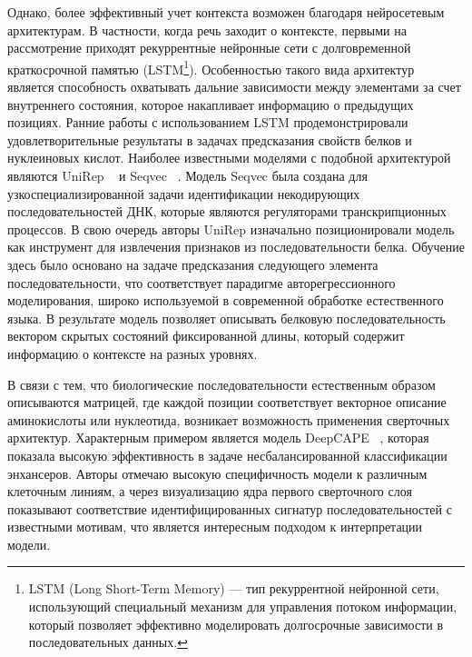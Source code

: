 \documentclass[specification,annotation,times]{itmo-student-thesis}
\begin{document}
Однако, более эффективный учет контекста возможен благодаря нейросетевым архитектурам. В частности, когда речь заходит о контексте, первыми на рассмотрение приходят рекуррентные нейронные сети с долговременной краткосрочной памятью (LSTM\footnote{LSTM (Long Short-Term Memory) --- тип рекуррентной нейронной сети, использующий специальный механизм для управления потоком информации, который позволяет эффективно моделировать долгосрочные зависимости в последовательных данных.}). Особенностью такого вида архитектур является способность охватывать дальние зависимости между элементами за счет внутреннего состояния, которое накапливает информацию о предыдущих позициях. Ранние работы с использованием LSTM продемонстрировали удовлетворительные результаты в задачах предсказания свойств белков и нуклеиновых кислот. Наиболее известными моделями с подобной архитектурой являются UniRep ~\cite{alley2019unified} и Seqvec ~\cite{nguyen2022ipromoter}. Модель Seqvec была создана для узкоспециализированной задачи идентификации некодирующих последовательностей ДНК, которые являются регуляторами транскрипционных процессов. В свою очередь авторы UniRep изначально позиционировали модель как инструмент для извлечения признаков из последовательности белка. Обучение здесь было основано на задаче предсказания следующего элемента последовательности, что соответствует парадигме авторегрессионного моделирования, широко используемой в современной обработке естественного языка. В результате модель позволяет описывать белковую последовательность вектором скрытых состояний фиксированной длины, который содержит информацию о контексте на разных уровнях.

В связи с тем, что биологические последовательности естественным образом описываются матрицей, где каждой позиции соответствует векторное описание аминокислоты или нуклеотида, возникает возможность применения сверточных архитектур. Характерным примером является модель DeepCAPE ~\cite{chen2021deepcape}, которая показала высокую эффективность в задаче несбалансированной классификации энхансеров. Авторы отмечаю высокую специфичность модели к различным клеточным линиям, а через визуализацию ядра первого сверточного слоя показывают соответствие идентифицированных сигнатур последовательностей с известными мотивам, что является интересным подходом к интерпретации модели.
\end{document}
